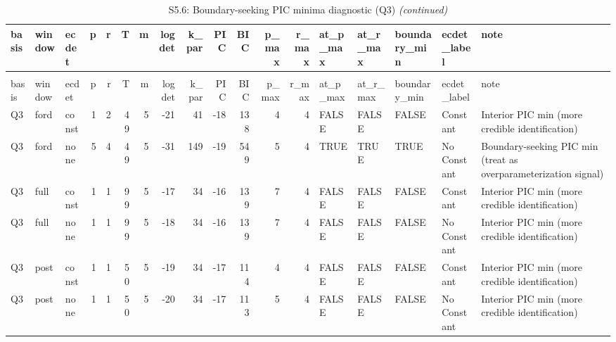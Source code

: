 \begingroup\fontsize{9}{11}\selectfont

\begin{longtable}[t]{lllrrrrrrrrrrlllll}
\caption{\label{tab:tab:S5_6_boundary_minima_Q3}S5.6: Boundary-seeking PIC minima diagnostic (Q3)}\\
\toprule
basis & window & ecdet & p & r & T & m & logdet & k\_par & PIC & BIC & p\_max & r\_max & at\_p\_max & at\_r\_max & boundary\_min & ecdet\_label & note\\
\midrule
\endfirsthead
\caption[]{S5.6: Boundary-seeking PIC minima diagnostic (Q3) \textit{(continued)}}\\
\toprule
basis & window & ecdet & p & r & T & m & logdet & k\_par & PIC & BIC & p\_max & r\_max & at\_p\_max & at\_r\_max & boundary\_min & ecdet\_label & note\\
\midrule
\endhead

\endfoot
\bottomrule
\endlastfoot
Q3 & ford & const & 1 & 2 & 49 & 5 & -21 & 41 & -18 & 138 & 4 & 4 & FALSE & FALSE & FALSE & Constant & Interior PIC min (more credible identification)\\
Q3 & ford & none & 5 & 4 & 49 & 5 & -31 & 149 & -19 & 549 & 5 & 4 & TRUE & TRUE & TRUE & No Constant & Boundary-seeking PIC min (treat as overparameterization signal)\\
Q3 & full & const & 1 & 1 & 99 & 5 & -17 & 34 & -16 & 139 & 7 & 4 & FALSE & FALSE & FALSE & Constant & Interior PIC min (more credible identification)\\
Q3 & full & none & 1 & 1 & 99 & 5 & -18 & 34 & -16 & 139 & 7 & 4 & FALSE & FALSE & FALSE & No Constant & Interior PIC min (more credible identification)\\
Q3 & post & const & 1 & 1 & 50 & 5 & -19 & 34 & -17 & 114 & 4 & 4 & FALSE & FALSE & FALSE & Constant & Interior PIC min (more credible identification)\\
\addlinespace
Q3 & post & none & 1 & 1 & 50 & 5 & -20 & 34 & -17 & 113 & 5 & 4 & FALSE & FALSE & FALSE & No Constant & Interior PIC min (more credible identification)\\*
\end{longtable}
\endgroup{}
